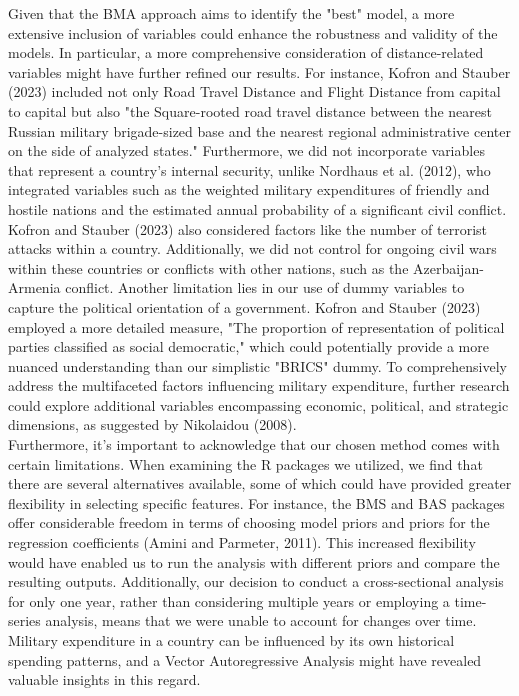 \documentclass[12pt,a4paper]{article}
\begin{document}
Given that the BMA approach aims to identify the "best" model, a more extensive inclusion of variables could enhance the robustness and validity of the models. In particular, a more comprehensive consideration of distance-related variables might have further refined our results. For instance, Kofron and Stauber (2023) included not only Road Travel Distance and Flight Distance from capital to capital but also "the Square-rooted road travel distance between the nearest Russian military brigade-sized base and the nearest regional administrative center on the side of analyzed states." Furthermore, we did not incorporate variables that represent a country's internal security, unlike Nordhaus et al. (2012), who integrated variables such as the weighted military expenditures of friendly and hostile nations and the estimated annual probability of a significant civil conflict. Kofron and Stauber (2023) also considered factors like the number of terrorist attacks within a country. Additionally, we did not control for ongoing civil wars within these countries or conflicts with other nations, such as the Azerbaijan-Armenia conflict. Another limitation lies in our use of dummy variables to capture the political orientation of a government. Kofron and Stauber (2023) employed a more detailed measure, "The proportion of representation of political parties classified as social democratic," which could potentially provide a more nuanced understanding than our simplistic "BRICS" dummy. To comprehensively address the multifaceted factors influencing military expenditure, further research could explore additional variables encompassing economic, political, and strategic dimensions, as suggested by Nikolaidou (2008).\\

Furthermore, it's important to acknowledge that our chosen method comes with certain limitations. When examining the R packages we utilized, we find that there are several alternatives available, some of which could have provided greater flexibility in selecting specific features. For instance, the BMS and BAS packages offer considerable freedom in terms of choosing model priors and priors for the regression coefficients (Amini and Parmeter, 2011). This increased flexibility would have enabled us to run the analysis with different priors and compare the resulting outputs. Additionally, our decision to conduct a cross-sectional analysis for only one year, rather than considering multiple years or employing a time-series analysis, means that we were unable to account for changes over time. Military expenditure in a country can be influenced by its own historical spending patterns, and a Vector Autoregressive Analysis might have revealed valuable insights in this regard. \\
\end{document}
